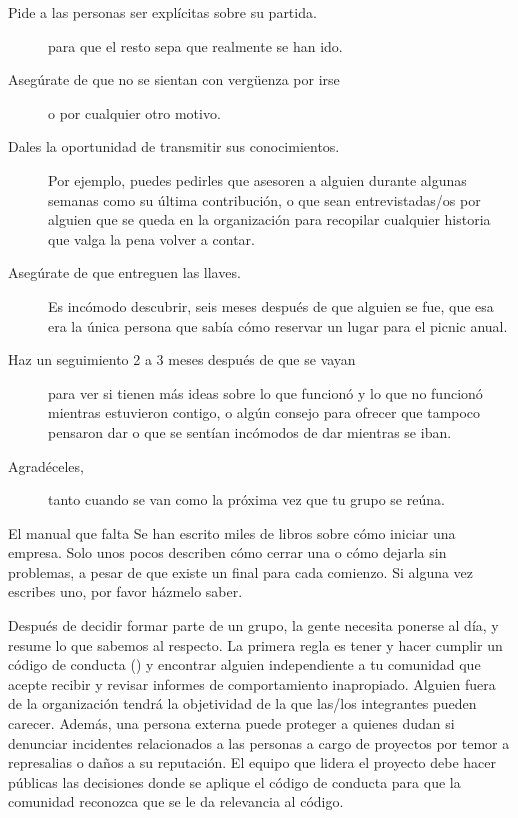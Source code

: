 \begin{description}

\item[Pide a las personas ser explícitas sobre su partida.]
  para que el resto sepa que realmente se han ido.

\item[Asegúrate de que no se sientan con vergüenza por irse]
  o por cualquier otro motivo.

\item[Dales la oportunidad de transmitir sus conocimientos.]
  Por ejemplo,
  puedes pedirles que asesoren a alguien durante algunas semanas como su última contribución,
  o que sean entrevistadas/os por alguien que se queda en la organización para recopilar cualquier historia que valga la pena volver a contar.

\item[Asegúrate de que entreguen las llaves.]
  Es incómodo descubrir, seis meses después de que alguien se fue,
  que esa era la única persona que sabía cómo reservar un lugar para el picnic anual.

\item[Haz un seguimiento 2 a 3 meses después de que se vayan]
  para ver si tienen más ideas sobre lo que funcionó y lo que no funcionó mientras estuvieron contigo,
  o algún consejo para ofrecer que tampoco pensaron dar
  o que se sentían incómodos de dar mientras se iban.

\item[Agradéceles,]
  tanto cuando se van como la próxima vez que tu grupo se reúna.

\end{description}

\begin{aside}{El manual que falta}
  Se han escrito miles de libros sobre cómo iniciar una empresa.
  Solo unos pocos describen cómo cerrar una o cómo dejarla sin problemas,
  a pesar de que existe un final para cada comienzo.
  Si alguna vez escribes uno,
  por favor házmelo saber.
\end{aside}


Después de decidir formar parte de un grupo,
la gente necesita ponerse al día,
y \cite{Shol2019} resume lo que sabemos al respecto.
La primera regla es tener y hacer cumplir un código de conducta ()
y encontrar alguien independiente a tu comunidad que acepte recibir y revisar informes de comportamiento inapropiado.
Alguien fuera de la organización tendrá la objetividad de la que las/los integrantes pueden carecer.
Además, una persona externa puede proteger a quienes dudan si denunciar incidentes relacionados a las personas
a cargo de proyectos por temor a represalias o daños a su reputación.
El equipo que lidera el proyecto debe hacer públicas las decisiones donde se aplique el código de conducta
para que la comunidad reconozca que se le da relevancia al código.

